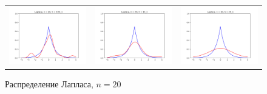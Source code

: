 	
	\begin{figure}[H]
		\centering
		\begin{tabular}{ccc}
			\includegraphics[width=55mm, height =0.25\textheight]{pics/ker_l_20_1.png}
			&
			\includegraphics[width=55mm, height =0.25\textheight]{pics/ker_l_20_2.png}
			&
			\includegraphics[width=55mm, height =0.25\textheight]{pics/ker_l_20_3.png}
		\end{tabular}
		\caption{Распределение Лапласа, $n = 20$}
		\label{fig:laplace}
	\end{figure}

